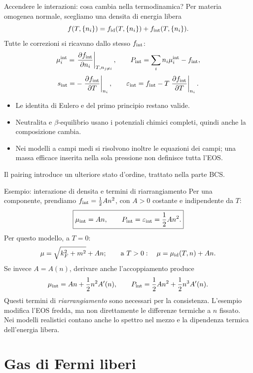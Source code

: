 \begin{frame}[t]{Accendere le interazioni: cosa cambia nella termodinamica?}
\vspace*{3mm}
\small
Per materia omogenea normale, scegliamo una densita di energia libera
\[
f(T,\{n_i\})=f_{\rm id}(T,\{n_i\})+f_{\rm int}(T,\{n_i\}).
\]
Tutte le correzioni si ricavano dallo stesso $f_{\rm int}$:
\[
\mu_i^{\rm int}=\left.\frac{\partial f_{\rm int}}{\partial n_i}
\right|_{T,n_{j\ne i}},\qquad
P_{\rm int}=\sum_i n_i\mu_i^{\rm int}-f_{\rm int},
\]
\[
s_{\rm int}=-\left.\frac{\partial f_{\rm int}}{\partial T}\right|_{n_i},
\qquad
\varepsilon_{\rm int}=f_{\rm int}
-T\left.\frac{\partial f_{\rm int}}{\partial T}\right|_{n_i}.
\]
\begin{itemize}
\item Le identita di Eulero e del primo principio restano valide.
\item Neutralita e $\beta$-equilibrio usano i potenziali chimici completi,
quindi anche la composizione cambia.
\item Nei modelli a campi medi si risolvono inoltre le equazioni dei campi;
una massa efficace inserita nella sola pressione non definisce tutta l'EOS.
\end{itemize}
Il pairing introduce un ulteriore stato d'ordine, trattato nella parte BCS.
\end{frame}

\begin{frame}[t]{Esempio: interazione di densita e termini di riarrangiamento}
\vspace*{3mm}
\small
Per una componente, prendiamo $f_{\rm int}=\tfrac12 A n^2$,
con $A>0$ costante e indipendente da $T$:
\[
\boxed{\mu_{\rm int}=An,\qquad
P_{\rm int}=\varepsilon_{\rm int}=\frac12 An^2.}
\]
Per questo modello, a $T=0$:
\[
\mu=\sqrt{k_F^2+m^2}+An;
\qquad \text{a }T>0:\quad \mu=\mu_{\rm id}(T,n)+An.
\]
Se invece $A=A(n)$, derivare anche l'accoppiamento produce
\[
\mu_{\rm int}=An+\frac12 n^2 A'(n),\qquad
P_{\rm int}=\frac12 An^2+\frac12 n^3 A'(n).
\]
Questi termini di \emph{riarrangiamento} sono necessari per la consistenza.
\smallskip
L'esempio modifica l'EOS fredda, ma non direttamente le differenze termiche
a $n$ fissato. Nei modelli realistici contano anche lo spettro nel mezzo
e la dipendenza termica dell'energia libera.
\end{frame}

\section{Gas di Fermi liberi}

